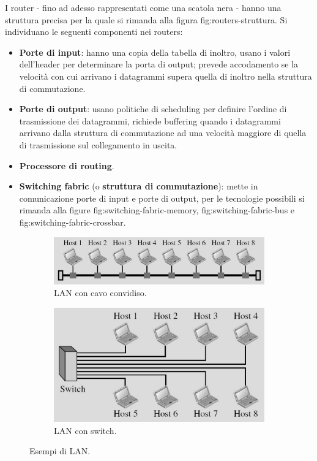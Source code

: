 \documentclass[11pt, italian, openany]{book}
\begin{document}
\begin{sloppypar}
{} \label{Routers}
I router - fino ad adesso rappresentati come una scatola nera - hanno una struttura precisa per la quale si rimanda alla figura fig:routers-struttura. Si
individuano le seguenti componenti nei routers:
\begin{itemize}[itemsep=0pt,topsep=0pt,parsep=0pt]
	\item \textbf{Porte di input}: hanno una copia della tabella di inoltro, usano i valori dell’header per determinare la porta di output; prevede accodamento
	se la velocit\`a con cui arrivano i datagrammi supera quella di inoltro nella struttura di commutazione.
	\item \textbf{Porte di output}: usano politiche di scheduling per definire l'ordine di trasmissione dei datagrammi, richiede buffering quando i datagrammi
	arrivano dalla struttura di commutazione ad una velocit\`a maggiore di quella di trasmissione sul collegamento in uscita.
	\item \textbf{Processore di routing}.
	\item \textbf{Switching fabric} (o \textbf{struttura di commutazione}): mette in comunicazione porte di input e porte di output, per le tecnologie possibili
	si rimanda alla figure fig:switching-fabric-memory, fig:switching-fabric-bus e fig:switching-fabric-crossbar.
\end{itemize}


\pagebreak

\begin{figure}[h!]
	\begin{subfigure}[t]{0.49 \linewidth} \centering
		\includegraphics[scale=0.35]{images/lan-obsoleta.png}
		\caption{LAN con cavo convidiso.}
	\end{subfigure}
	\begin{subfigure}[t]{0.49 \linewidth} \centering
		\includegraphics[scale=0.4]{images/lan-moderna.png}
		\caption{LAN con switch.}
	\end{subfigure}
	\caption{Esempi di LAN.}
	\label{fig:LAN}
\end{figure}


\end{sloppypar}
\end{document}
